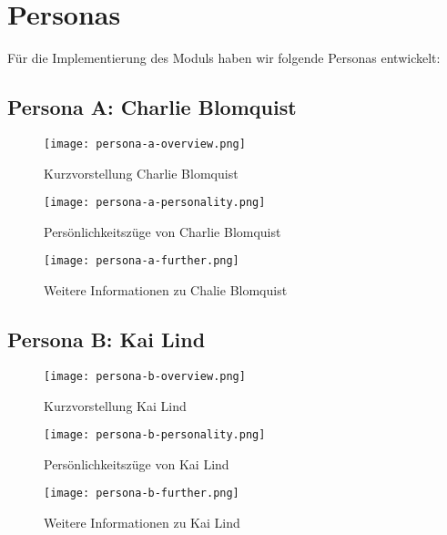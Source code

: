 \chapter{Personas}

Für die Implementierung des Moduls haben wir folgende Personas entwickelt:

\section{Persona A: Charlie Blomquist}

\begin{figure}[H]
	\centering
	\texttt{[image: persona-a-overview.png]}
    \caption{Kurzvorstellung Charlie Blomquist}
	\label{fig:personaashort}
\end{figure}

\begin{figure}[H]
	\centering
	\texttt{[image: persona-a-personality.png]}
    \caption{Persönlichkeitszüge von Charlie Blomquist}
	\label{fig:personaapers}
\end{figure}

\begin{figure}[H]
	\centering
	\texttt{[image: persona-a-further.png]}
    \caption{Weitere Informationen zu Chalie Blomquist}
	\label{fig:personaafurther}
\end{figure}

\section{Persona B: Kai Lind}

\begin{figure}[H]
	\centering
	\texttt{[image: persona-b-overview.png]}
    \caption{Kurzvorstellung Kai Lind}
	\label{fig:personabshort}
\end{figure}

\begin{figure}[H]
	\centering
	\texttt{[image: persona-b-personality.png]}
    \caption{Persönlichkeitszüge von Kai Lind}
	\label{fig:personabpers}
\end{figure}

\begin{figure}[H]
	\centering
	\texttt{[image: persona-b-further.png]}
    \caption{Weitere Informationen zu Kai Lind}
	\label{fig:personabfurther}
\end{figure}


